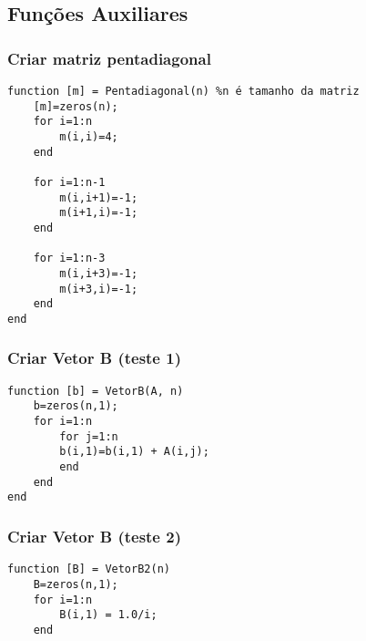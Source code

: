 \documentclass[10pt,a4paper]{article}
\begin{document}
	\subsection*{Funções Auxiliares}
	\subsubsection*{Criar matriz pentadiagonal}
	\begin{verbatim}
function [m] = Pentadiagonal(n) %n é tamanho da matriz
    [m]=zeros(n);
    for i=1:n
        m(i,i)=4;
    end

    for i=1:n-1
        m(i,i+1)=-1;
        m(i+1,i)=-1;
    end

    for i=1:n-3
        m(i,i+3)=-1;
        m(i+3,i)=-1;
    end
end
\end{verbatim}
\subsubsection*{Criar Vetor B (teste 1)}
\begin{verbatim}
function [b] = VetorB(A, n)
    b=zeros(n,1);
    for i=1:n
        for j=1:n
        b(i,1)=b(i,1) + A(i,j);
        end
    end
end
\end{verbatim}
\subsubsection*{Criar Vetor B (teste 2)}
\begin{verbatim}
function [B] = VetorB2(n)
    B=zeros(n,1);
    for i=1:n
        B(i,1) = 1.0/i;
    end
    
\end{verbatim}
\end{document}
